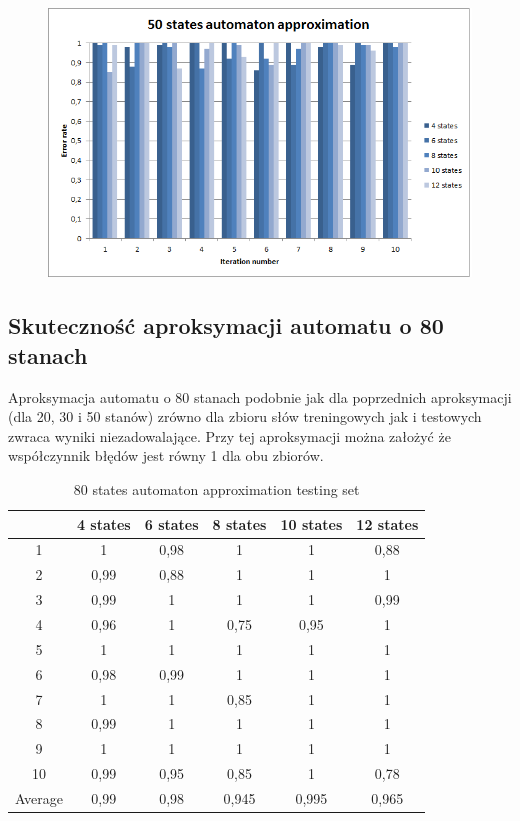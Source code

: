\documentclass[runningheads,a4paper]{llncs}
\begin{document}
\begin{figure}
\centering
\includegraphics[scale=1]{9.png}
\end{figure}

\FloatBarrier
\subsection{Skuteczność aproksymacji automatu o 80 stanach}

Aproksymacja automatu o 80 stanach podobnie jak dla poprzednich aproksymacji (dla 20, 30 i 50 stanów) zrówno dla zbioru słów treningowych jak i testowych zwraca wyniki niezadowalające. Przy tej aproksymacji można założyć że współczynnik błędów jest równy 1 dla obu zbiorów. \\

\begin{table}[]
\centering
\caption{80 states automaton approximation testing set}
\label{my-label}
\begin{tabular}{@{}cccccc@{}}
\toprule
        & 4 states & 6 states & 8 states & 10 states & 12 states    \\ \midrule
1       & 1        & 0,98     & 1        & 1         & 0,88 \\
2       & 0,99     & 0,88     & 1        & 1         & 1 \\
3       & 0,99     & 1        & 1        & 1         & 0,99 \\
4       & 0,96     & 1        & 0,75     & 0,95      & 1   \\
5       & 1        & 1        & 1        & 1         & 1   \\
6       & 0,98     & 0,99     & 1        & 1         & 1    \\
7       & 1        & 1        & 0,85     & 1         & 1    \\
8       & 0,99     & 1        & 1        & 1         & 1     \\
9       & 1        & 1        & 1        & 1         & 1 \\
10      & 0,99     & 0,95     & 0,85     & 1         & 0,78  \\
Average & 0,99     & 0,98     & 0,945    & 0,995     & 0,965  \\ \bottomrule
\end{tabular}
\end{table}
\end{document}
